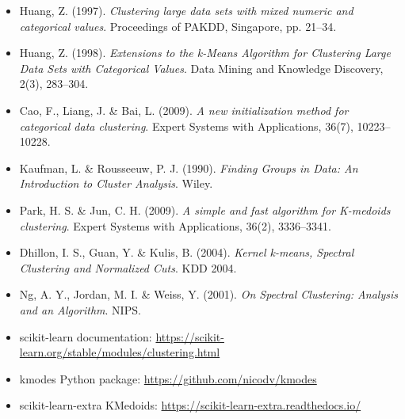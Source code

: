 \documentclass{article}
\begin{document}
\begin{itemize}[leftmargin=*]
    \item Huang, Z. (1997). \textit{Clustering large data sets with mixed numeric and categorical values}. Proceedings of PAKDD, Singapore, pp. 21--34.
    \item Huang, Z. (1998). \textit{Extensions to the k-Means Algorithm for Clustering Large Data Sets with Categorical Values}. Data Mining and Knowledge Discovery, 2(3), 283--304.
    \item Cao, F., Liang, J. \& Bai, L. (2009). \textit{A new initialization method for categorical data clustering}. Expert Systems with Applications, 36(7), 10223--10228.
    \item Kaufman, L. \& Rousseeuw, P. J. (1990). \textit{Finding Groups in Data: An Introduction to Cluster Analysis}. Wiley.
    \item Park, H. S. \& Jun, C. H. (2009). \textit{A simple and fast algorithm for K-medoids clustering}. Expert Systems with Applications, 36(2), 3336--3341.
    \item Dhillon, I. S., Guan, Y. \& Kulis, B. (2004). \textit{Kernel k-means, Spectral Clustering and Normalized Cuts}. KDD 2004.
    \item Ng, A. Y., Jordan, M. I. \& Weiss, Y. (2001). \textit{On Spectral Clustering: Analysis and an Algorithm}. NIPS.
    \item scikit-learn documentation: \url{https://scikit-learn.org/stable/modules/clustering.html}
    \item kmodes Python package: \url{https://github.com/nicodv/kmodes}
    \item scikit-learn-extra KMedoids: \url{https://scikit-learn-extra.readthedocs.io/}
\end{itemize}
\end{document}
